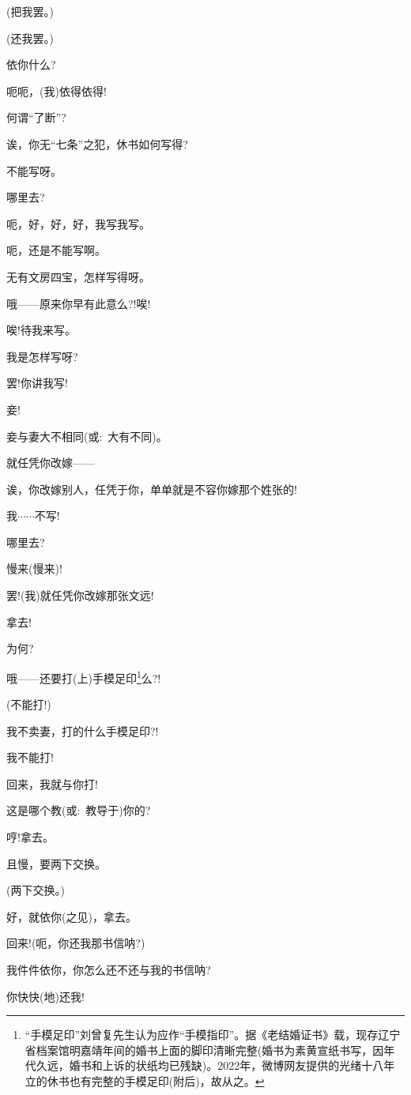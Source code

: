 {{(把我罢。)}

{(还我罢。)}

{依你什么?}

{呃呃，(我)依得依得!}

{何谓``了断''?}

{诶，你无``七条''之犯，休书如何写得?}

{不能写呀。}

{哪里去?}

{呃，好，好，好，我写我写。}

{呃，还是不能写啊。}

{无有文房四宝，怎样写得呀。}

{哦------原来你早有此意么?!唉!}

{唉!待我来写。}

{我是怎样写呀?}

{罢!你讲我写!}

{妾!}

{妾与妻大不相同({\akai 或}:~大有不同)。}

{就任凭你改嫁------}

{诶，你改嫁别人，任凭于你，单单就是不容你嫁那个姓张的!}

{我$\cdots{}\cdots{}$不写!}

{哪里去?}

{慢来(慢来)!}

{罢!(我)就任凭你改嫁那张文远!}

{拿去!}

{为何?}

{哦------还要打(上)手模足印\footnote{``手模足印''刘曾复先生认为应作``手模指印''。据《老结婚证书》载，现存辽宁省档案馆明嘉靖年间的婚书上面的脚印清晰完整(婚书为素黄宣纸书写，因年代久远，婚书和上诉的状纸均已残缺)。2022年，微博网友提供的光绪十八年立的休书也有完整的手模足印(附后)，故从之。}么?!}

{(不能打!)}

{我不卖妻，打的什么手模足印?!}

{我不能打!}

{回来，我就与你打!}

{这是哪个教({\akai 或}:~教导于)你的?}

{哼!拿去。}

{且慢，要两下交换。}

{(两下交换。)}

{好，就依你(之见)，拿去。}

{回来!(呃，你还我那书信呐?)}

{我件件依你，你怎么还不还与我的书信呐?}

{你快快(地)还我!}

}
